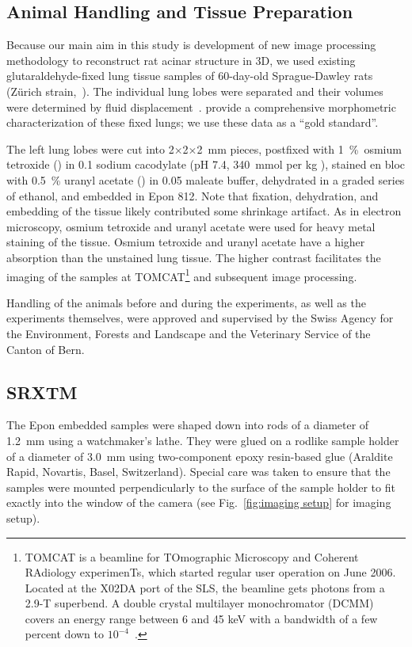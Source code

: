 \subsection[Animal Handling]{Animal Handling and Tissue Preparation}
Because our main aim in this study is development of new image processing methodology to reconstruct rat acinar structure in 3D, we used existing glutaraldehyde-fixed lung tissue samples of 60-day-old Sprague-Dawley rats (Zürich strain,~\cite{Tschanz2003}). The individual lung lobes were separated and their volumes were determined by fluid displacement~\cite{Scherle1970}. \citet{Tschanz2003} provide a comprehensive morphometric characterization of these fixed lungs; we use these data as a ``gold standard''.

The left lung lobes were cut into 2$\times$2$\times$\SI{2}{\milli\meter} pieces, postfixed with \SI{1}{\percent}~osmium tetroxide () in \SI{0.1}{\Molar} sodium cacodylate (pH 7.4, \SI{340}{\mmol} per \si{\kilogram} ), stained en bloc with \SI{0.5}{\percent} uranyl acetate () in \SI{0.05}{\Molar} maleate buffer, dehydrated in a graded series of ethanol, and embedded in Epon 812. Note that fixation, dehydration, and embedding of the tissue likely contributed some shrinkage artifact. As in electron microscopy, osmium tetroxide and uranyl acetate were used for heavy metal staining of the tissue. Osmium tetroxide and uranyl acetate have a higher absorption than the unstained lung tissue. The higher contrast facilitates the imaging of the samples at TOMCAT\footnote{TOMCAT is a beamline for TOmographic Microscopy and Coherent RAdiology experimenTs, which started regular user operation on June 2006. Located at the X02DA port of the SLS, the beamline gets photons from a 2.9-T superbend. A double crystal multilayer monochromator (DCMM) covers an energy range between 6 and 45 keV with a bandwidth of a few percent down to $10^{-4}$~\cite{Stampanoni2007}.} and subsequent image processing.

Handling of the animals before and during the experiments, as well as the experiments themselves, were approved and supervised by the Swiss Agency for the Environment, Forests and Landscape and the Veterinary Service of the Canton of Bern.

\subsection{SRXTM}
The Epon embedded samples were shaped down into rods of a diameter of \SI{1.2}{\milli\meter} using a watchmaker's lathe. They were glued on a rodlike sample holder of a diameter of \SI{3.0}{\milli\meter} using two-component epoxy resin-based glue (Araldite Rapid, Novartis, Basel, Switzerland). Special care was taken to ensure that the samples were mounted perpendicularly to the surface of the sample holder to fit exactly into the window of the camera (see Fig.~\ref{fig:imaging setup} for imaging setup).

